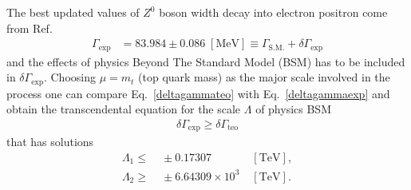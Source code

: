 The best updated values of $Z^0$ boson width decay into electron positron come from Ref.~\cite{Beringer:1900zz}
\begin{align}
\label{deltagammaexp}
 \Gamma_{\text{exp}} &= 83.984 \pm 0.086\;[\text{MeV}] \equiv \Gamma_{\text{S.M.}} + \delta\Gamma_{\text{exp}}
\end{align}
and the effects of physics Beyond The Standard Model (BSM) has to be included in $\delta\Gamma_{\text{exp}}$. Choosing $\mu = m_t$ (top quark mass) as the major scale involved in the process one can compare Eq.~\eqref{deltagammateo} with Eq.~\eqref{deltagammaexp} and obtain the transcendental equation for the scale $\Lambda$ of physics BSM 
\begin{align}
\delta\Gamma_{\text{exp}} \geq \delta\Gamma_{\text{teo}}
\end{align}
that has solutions
\begin{eqnarray}
 \label{lowscalefromz}
 \Lambda_1 \leq&\; \pm0.17307\;&[\text{TeV}], \\
 \label{upscalefromz}
 \Lambda_2 \geq&\; \pm6.64309\times10^3\;&[\text{TeV}].
\end{eqnarray}
